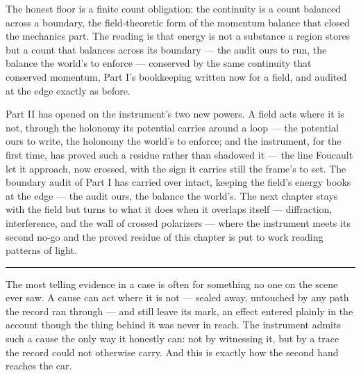 The honest floor is a finite count obligation: the continuity is a count balanced across a boundary, the
field-theoretic form of the momentum balance that closed the mechanics part. The reading is that energy is not
a substance a region stores but a count that balances across its boundary --- the audit ours to run, the
balance the world's to enforce --- conserved by the same continuity that conserved momentum, Part I's
bookkeeping written now for a field, and audited at the edge exactly as before.

\bigskip

Part II has opened on the instrument's two new powers. A field acts where it is not, through the holonomy its
potential carries around a loop --- the potential ours to write, the holonomy the world's to enforce; and the
instrument, for the first time, has proved such a residue rather than shadowed it --- the line Foucault let it
approach, now crossed, with the sign it carries still the frame's to set. The boundary audit of Part I has
carried over intact, keeping the field's energy books at the edge --- the audit ours, the balance the world's.
The next chapter stays with the field but turns to what it does when it overlaps itself --- diffraction,
interference, and the wall of crossed polarizers --- where the instrument meets its second no-go and the proved
residue of this chapter is put to work reading patterns of light.

\bigskip
\begin{center}
\rule{0.4\textwidth}{0.4pt}
\end{center}
\bigskip

\noindent The most telling evidence in a case is often for something no one on the scene ever saw. A cause can
act where it is not --- sealed away, untouched by any path the record ran through --- and still leave its mark,
an effect entered plainly in the account though the thing behind it was never in reach. The instrument admits
such a cause the only way it honestly can: not by witnessing it, but by a trace the record could not otherwise
carry. And this is exactly how the second hand reaches the car.

